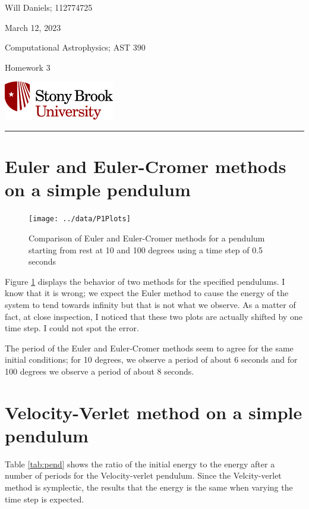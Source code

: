 \documentclass[12pt, letterpaper]{article}
\begin{document}
\noindent
\begin{minipage}{0.5\textwidth}
    Will Daniels; 112774725

    March 12, 2023

    Computational Astrophysics; AST 390

    Homework 3
\end{minipage}
%
\begin{minipage}{0.5\textwidth}
    \begin{flushright}
        \includegraphics[height = 48pt]{../../LatexAssets/SBULogoStacked}
    \end{flushright}
\end{minipage}
\noindent
\rule{\textwidth}{1pt}

\tableofcontents

\section{Euler and Euler-Cromer methods on a simple pendulum}

\begin{figure}[!b]
  \centering
  \caption{Comparison of Euler and Euler-Cromer methods for a pendulum starting
    from rest at 10 and 100 degrees using a time step of 0.5 seconds}
  \label{fig:pend}
  \texttt{[image: ../data/P1Plots]}
\end{figure}

Figure \ref{fig:pend} displays the behavior of two methods for the specified
pendulums. I know that it is wrong; we expect the Euler method to cause the
energy of the system to tend towards infinity but that is not what we observe.
As a matter of fact, at close inspection, I noticed that these two plots are
actually shifted by one time step. I could not spot the error.

The period of the Euler and Euler-Cromer methods seem to agree for the same
initial conditions; for 10 degrees, we observe a period of about 6 seconds and
for 100 degrees we observe a period of about 8 seconds.

\section{Velocity-Verlet method on a simple pendulum}

Table \ref{tab:pend} shows the ratio of the initial energy to the energy after a
number of periods for the Velocity-verlet pendulum. Since the Velcity-verlet
method is symplectic, the results that the energy is the same when varying the
time step is expected.
\end{document}
